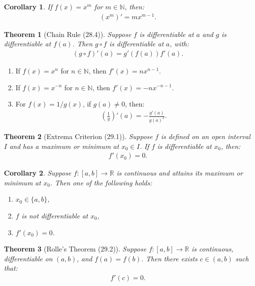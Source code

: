 \documentclass[7pt]{article}
\theoremstyle{definition}
\theoremstyle{plain}
\newtheorem{theorem}{Theorem}
\newtheorem{corollary}{Corollary}
\begin{document}
\begin{corollary}
If $ f(x) = x^m $ for $ m \in \mathbb{N} $, then:
\begin{align}
(x^m)' = mx^{m-1}.
\end{align}
\end{corollary}

\begin{theorem}[Chain Rule (28.4)]
Suppose $ f $ is differentiable at $ a $ and $ g $ is differentiable at $ f(a) $. Then $ g \circ f $ is differentiable at $ a $, with:
\begin{align}
(g \circ f)'(a) = g'(f(a))f'(a).
\end{align}
\end{theorem}

\begin{enumerate}
    \item If $ f(x) = x^n $ for $ n \in \mathbb{N} $, then $ f'(x) = nx^{n-1} $.
    \item If $ f(x) = x^{-n} $ for $ n \in \mathbb{N} $, then $ f'(x) = -nx^{-n-1} $.
    \item For $ f(x) = 1/g(x) $, if $ g(a) \neq 0 $, then:
    \begin{align}
    \left( \frac{1}{g} \right)'(a) = -\frac{g'(a)}{g(a)^2}.
    \end{align}
\end{enumerate}

\begin{theorem}[Extrema Criterion (29.1)]
Suppose $ f $ is defined on an open interval $ I $ and has a maximum or minimum at $ x_0 \in I $. If $ f $ is differentiable at $ x_0 $, then:
\begin{align}
f'(x_0) = 0.
\end{align}
\end{theorem}

\begin{corollary}
Suppose $ f : [a, b] \to \mathbb{R} $ is continuous and attains its maximum or minimum at $ x_0 $. Then one of the following holds:
\begin{enumerate}
    \item $ x_0 \in \{a, b\} $,
    \item $ f $ is not differentiable at $ x_0 $,
    \item $ f'(x_0) = 0 $.
\end{enumerate}
\end{corollary}

\begin{theorem}[Rolle’s Theorem (29.2)]
Suppose $ f : [a, b] \to \mathbb{R} $ is continuous, differentiable on $ (a, b) $, and $ f(a) = f(b) $. Then there exists $ c \in (a, b) $ such that:
\begin{align}
f'(c) = 0.
\end{align}
\end{theorem}
\end{document}
